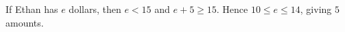 If Ethan has $e$ dollars, then $e<15$ and $e+5\ge15$. Hence $10\le e\le14$, giving $\boxed5$ amounts.
